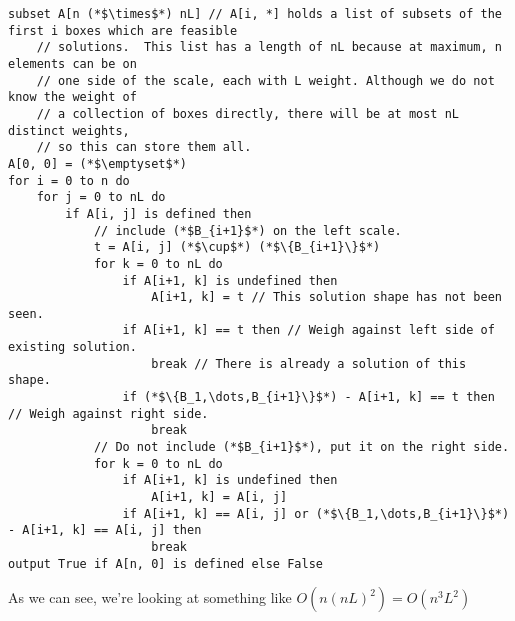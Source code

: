 \documentclass{article}
\begin{document}
    \begin{lstlisting}
subset A[n (*$\times$*) nL] // A[i, *] holds a list of subsets of the first i boxes which are feasible
    // solutions.  This list has a length of nL because at maximum, n elements can be on
    // one side of the scale, each with L weight. Although we do not know the weight of 
    // a collection of boxes directly, there will be at most nL distinct weights,
    // so this can store them all.
A[0, 0] = (*$\emptyset$*)
for i = 0 to n do
    for j = 0 to nL do
        if A[i, j] is defined then
            // include (*$B_{i+1}$*) on the left scale.
            t = A[i, j] (*$\cup$*) (*$\{B_{i+1}\}$*)
            for k = 0 to nL do
                if A[i+1, k] is undefined then
                    A[i+1, k] = t // This solution shape has not been seen.
                if A[i+1, k] == t then // Weigh against left side of existing solution.
                    break // There is already a solution of this shape.
                if (*$\{B_1,\dots,B_{i+1}\}$*) - A[i+1, k] == t then // Weigh against right side.
                    break
            // Do not include (*$B_{i+1}$*), put it on the right side.
            for k = 0 to nL do
                if A[i+1, k] is undefined then
                    A[i+1, k] = A[i, j]
                if A[i+1, k] == A[i, j] or (*$\{B_1,\dots,B_{i+1}\}$*) - A[i+1, k] == A[i, j] then
                    break
output True if A[n, 0] is defined else False
    \end{lstlisting}
As we can see, we're looking at something like $O(n(nL)^2) = O(n^3L^2)$
\end{document}
